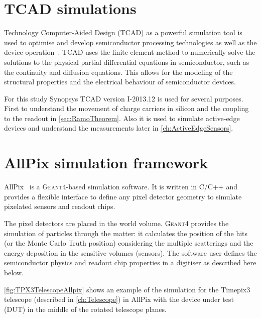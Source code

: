 \section{TCAD simulations}
\label{sec:TCAD}
Technology Computer-Aided Design (TCAD) as a powerful simulation tool
is used to optimise and develop semiconductor processing technologies
as well as the device operation~\cite{synopsysTCAD}. TCAD uses the
finite element method to numerically solve the solutions to the
physical partial differential equations in semiconductor, such as the
continuity and diffusion equations. This allows for the modeling of
the structural properties and the electrical behaviour of
semiconductor devices.

For this study Synopsys TCAD version I-2013.12 is used for several
purposes. First to understand the movement of charge carriers in
silicon and the coupling to the readout in
\cref{sec:RamoTheorem}. Also it is used to simulate active-edge
devices and understand the measurements later in
\cref{ch:ActiveEdgeSensors}.
\section{AllPix simulation framework}
\label{sec:AllPix}

AllPix~\cite{allpix} is a \textsc{Geant4}-based simulation
software. It is written in C/C++ and provides a flexible interface to
define any pixel detector geometry to simulate pixelated sensors and
readout chips.

The pixel detectors are placed in the world volume. \textsc{Geant4}
provides the simulation of particles through the matter: it calculates
the position of the hits (or the Monte Carlo Truth position)
considering the multiple scatterings and the energy deposition in the
sensitive volumes (sensors). The software user defines the
semiconductor physics and readout chip properties in a digitiser as
described here below.

\cref{fig:TPX3TelescopeAllpix} shows an example of the simulation for
the Timepix3 telescope (described in \cref{ch:Telescope}) in AllPix
with the device under test (DUT) in the middle of the rotated telescope
planes.

